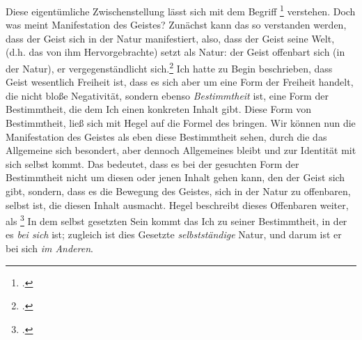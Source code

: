 \documentclass[12pt, a4paper, openany]{report}
\begin{document}
Diese eigentümliche Zwischenstellung lässt sich mit dem Begriff \footcite[][140]{menke_autonomie_2018} verstehen. 
Doch was meint Manifestation des Geistes?
Zunächst kann das so verstanden werden, dass der Geist sich in der Natur manifestiert, also, dass der Geist seine Welt, (d.h. das von ihm Hervorgebrachte) setzt als Natur: der Geist offenbart sich (in der Natur), er vergegenständlicht sich.\footcite[Vgl.][143]{menke_autonomie_2018}
Ich hatte zu Begin beschrieben, dass Geist wesentlich Freiheit ist, dass es sich aber um eine Form der Freiheit handelt, die nicht bloße Negativität, sondern ebenso \emph{Bestimmtheit} ist, eine Form der Bestimmtheit, die dem Ich einen konkreten Inhalt gibt.
Diese Form von Bestimmtheit, ließ sich mit Hegel auf die Formel des  bringen.
Wir können nun die Manifestation des Geistes als eben diese Bestimmtheit sehen, durch die das Allgemeine sich besondert, aber dennoch Allgemeines bleibt und zur Identität mit sich selbst kommt.
Das bedeutet, dass es bei der gesuchten Form der Bestimmtheit nicht um diesen oder jenen Inhalt gehen kann, den der Geist sich gibt, sondern, dass es die Bewegung des Geistes, sich in der Natur zu offenbaren, selbst ist, die diesen Inhalt ausmacht. 
Hegel beschreibt dieses Offenbaren weiter, als \footcite[][§ 384, S. 29]{hegel_enzyklopädie_1969} 
In dem selbst gesetzten Sein kommt das Ich zu seiner Bestimmtheit, in der es \emph{bei sich} ist; zugleich ist dies Gesetzte \emph{selbstständige} Natur, und darum ist er bei sich \emph{im Anderen}.
\end{document}
